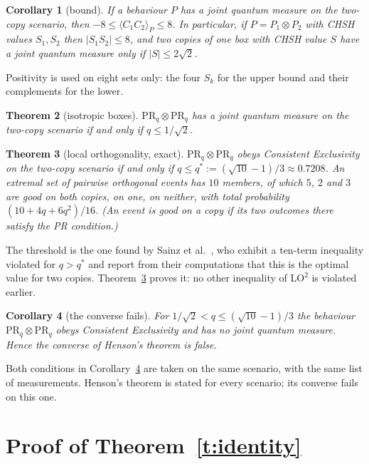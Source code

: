 \documentclass[11pt,a4paper]{article}
\newtheorem{theorem}{Theorem}
\newtheorem{corollary}[theorem]{Corollary}
\theoremstyle{definition}
\theoremstyle{remark}
\newcommand{\PR}{\mathrm{PR}}
\newcommand{\ev}[1]{\langle #1\rangle_P}
\begin{document}
\begin{corollary}[bound]\label{c:bound}
If a behaviour $P$ has a joint quantum measure on the two-copy scenario, then
$-8\le\ev{C_1C_2}\le 8$. In particular, if $P=P_1\otimes P_2$ with CHSH values $S_1,S_2$ then
$|S_1S_2|\le 8$, and two copies of one box with CHSH value $S$ have a joint quantum measure only if
$|S|\le2\sqrt2$.
\end{corollary}

Positivity is used on eight sets only: the four $S_k$ for the upper bound and their complements for the
lower.

\begin{theorem}[isotropic boxes]\label{t:iso}
$\PR_q\otimes\PR_q$ has a joint quantum measure on the two-copy scenario if and only if $q\le1/\sqrt2$.
\end{theorem}

\begin{theorem}[local orthogonality, exact]\label{t:lo}
$\PR_q\otimes\PR_q$ obeys Consistent Exclusivity on the two-copy scenario if and only if
$q\le q^*:=(\sqrt{10}-1)/3\approx0.7208$. An extremal set of pairwise orthogonal events has $10$
members, of which $5$, $2$ and $3$ are good on both copies, on one, on neither, with total probability
$(10+4q+6q^2)/16$. (An event is \emph{good} on a copy if its two outcomes there satisfy the PR
condition.)
\end{theorem}

The threshold is the one found by Sainz et al.\ \cite{Sainz}, who exhibit a ten-term inequality violated
for $q>q^*$ and report from their computations that this is the optimal value for two copies.
Theorem~\ref{t:lo} proves it: no other inequality of $\mathrm{LO}^2$ is violated earlier.

\begin{corollary}[the converse fails]\label{c:converse}
For $1/\sqrt2<q\le(\sqrt{10}-1)/3$ the behaviour $\PR_q\otimes\PR_q$ obeys Consistent Exclusivity and
has no joint quantum measure. Hence the converse of Henson's theorem \cite{Henson} is false.
\end{corollary}

Both conditions in Corollary~\ref{c:converse} are taken on the same scenario, with the same list of
measurements. Henson's theorem is stated for every scenario; its converse fails on this one.

\section{Proof of Theorem~\ref{t:identity}}
\end{document}
